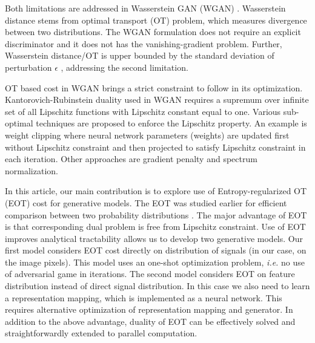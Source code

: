 Both limitations are addressed in Wasserstein GAN (WGAN)
\cite{2017arXiv170107875A}. Wasserstein distance stems from
optimal transport (OT) problem, which measures divergence between two
distributions. The WGAN formulation does not require an explicit
discriminator and it does not has the vanishing-gradient problem. Further,
Wasserstein distance/OT is upper bounded by the standard deviation of perturbation $\epsilon$
\cite{2017arXiv170104862A}, addressing the second limitation. 

OT based cost in WGAN brings a strict constraint to follow in its optimization.
Kantorovich-Rubinstein duality used in WGAN requires a supremum over
infinite set of all Lipschitz functions with Lipschitz constant equal
to one. Various sub-optimal techniques are proposed to enforce the
Lipschitz property. An example is weight clipping
\cite{2017arXiv170107875A} where neural network parameters (weights)
are updated first without Lipschitz constraint and then projected to
satisfy Lipschitz constraint in each iteration. Other approaches are
gradient penalty\cite{2017arXiv170400028G} and spectrum normalization\cite{2018arXiv180205957M}.

In this article, our main contribution is to explore use of Entropy-regularized OT (EOT) cost for generative models. 
The EOT was studied earlier for efficient comparison between two probability distributions \cite{2013arXiv1306.0895C}. 
The major advantage of EOT is
that corresponding dual problem is free from Lipschitz constraint. Use of EOT improves
analytical tractability allows us to develop two generative models. Our
first model considers EOT cost directly on distribution of signals (in our case,
on the image pixels). This model uses an one-shot optimization problem, \emph{i.e.} no use of adversarial game in iterations. The second model
considers EOT on feature distribution instead of direct signal
distribution. In this case we also need to learn a representation
mapping, which is implemented as a neural network. 
This requires alternative optimization of representation mapping and
generator. In addition to the above advantage, duality of EOT can be
effectively solved and straightforwardly extended to parallel computation. 





